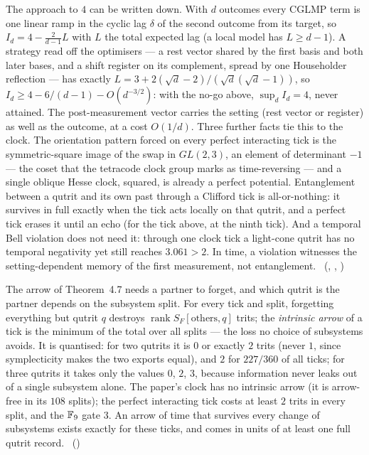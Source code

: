 The approach to $4$ can be written down. With $d$ outcomes every CGLMP term is one linear ramp in the cyclic lag $\delta$
of the second outcome from its target, so $I_d=4-\tfrac{2}{d-1}L$ with $L$ the total expected lag (a local model has
$L\ge d-1$). A strategy read off the optimisers --- a rest vector shared by the first basis and both later bases, and a
shift register on its complement, spread by one Householder reflection --- has exactly
$L=3+2(\sqrt d-2)/(\sqrt d(\sqrt d-1))$, so $I_d\ge 4-6/(d-1)-O(d^{-3/2})$: with the no-go above, $\sup_d I_d=4$, never
attained. The post-measurement vector carries the setting (rest vector or register) as well as the outcome, at a cost
$O(1/d)$. Three further facts tie this to the clock. The orientation pattern forced on every perfect interacting tick is
the symmetric-square image of the swap in $GL(2,3)$, an element of determinant $-1$ --- the coset that the tetracode
clock group marks as time-reversing --- and a single oblique Hesse clock, squared, is already a perfect potential.
Entanglement between a qutrit and its own past through a Clifford tick is all-or-nothing: it survives in full exactly
when the tick acts locally on that qutrit, and a perfect tick erases it until an echo (for the tick above, at the ninth
tick). And a temporal Bell violation does not need it: through one clock tick a light-cone qutrit has no temporal
negativity yet still reaches $3.061>2$. In time, a violation witnesses the setting-dependent memory of the first
measurement, not entanglement. \tierC\ (,
, )

The arrow of Theorem~4.7 needs a partner to forget, and which qutrit is the partner depends on the subsystem split. For
every tick and split, forgetting everything but qutrit $q$ destroys $\operatorname{rank}S_F[\text{others},q]$ trits; the
\emph{intrinsic arrow} of a tick is the minimum of the total over all splits --- the loss no choice of subsystems avoids.
It is quantised: for two qutrits it is $0$ or exactly $2$ trits (never $1$, since symplecticity makes the two exports
equal), and $2$ for $227/360$ of all ticks; for three qutrits it takes only the values $0$, $2$, $3$, because information
never leaks out of a single subsystem alone. The paper's clock has no intrinsic arrow (it is arrow-free in its $108$
splits); the perfect interacting tick costs at least $2$ trits in every split, and the $\mathbb{F}_9$ gate $3$. An arrow of time
that survives every change of subsystems exists exactly for these ticks, and comes in units of at least one full qutrit
record. \tierC\ ()

